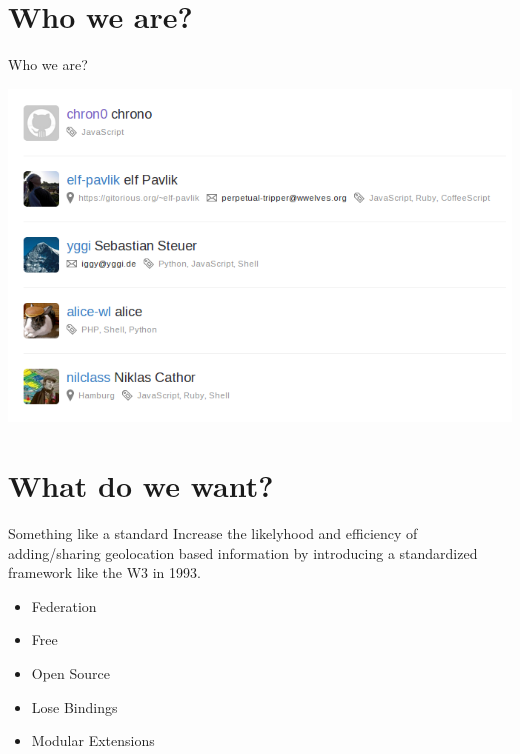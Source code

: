 \documentclass{beamer}
\begin{document}

%
%

\section{Who we are?}

\begin{frame}{Who we are?}
 \vspace{0.8em}
 \begin{center}
  \includegraphics[scale=0.4]{images/dspace-hackers}
 \end{center}
\end{frame}


\section{What do we want?}

\begin{frame}{Something like a standard}
 Increase the likelyhood and efficiency of adding/sharing geolocation based information by introducing
 a standardized framework like the W3 in 1993.
 \linebreak
 \begin{itemize}
  \item Federation
  \item Free
  \item Open Source
  \item Lose Bindings
  \item Modular Extensions
 \end{itemize}
\end{frame}
\end{document}
